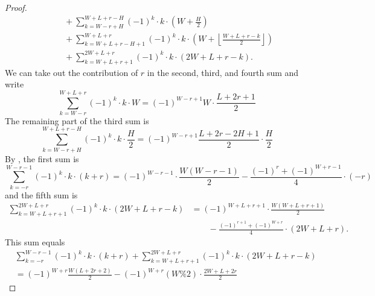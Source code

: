 \begin{proof}
\begin{align*}
    &\qquad+ \sum_{k=W-r + H}^{W+L+r - H}
      (-1)^{k} \cdot k \cdot \left( W + \frac H2 \right) \\
    &\qquad+ \sum_{k=W+L+r - H + 1}^{W+L+r} (-1)^{k} \cdot k \cdot
      \left( W + \left\lfloor \frac{W+L+r-k}{2} \right\rfloor \right) \\
    &\qquad+ \sum_{k=W+L+r+1}^{2W+L+r} (-1)^{k} \cdot k \cdot (2W+L+r-k).
  \end{align*}
  We can take out the contribution of $r$ in the second, third, and fourth sum and write
  \begin{equation}
    \sum_{k=W-r}^{W+L+r} (-1)^k \cdot k \cdot W = (-1)^{W-r+1} W \cdot \frac{L+2r+1}{2}
    \label{eq:moment234r}
  \end{equation}
  The remaining part of the third sum is
  \begin{equation}
    \sum_{k=W-r + H}^{W+L+r - H} (-1)^{k} \cdot k \cdot \frac H2
    = (-1)^{W-r+1} \frac{L+2r-2H+1}{2} \cdot \frac H2
    \label{eq:moment3top}
  \end{equation}
  By , the first sum is
  \[ \sum_{k=-r}^{W-r-1} (-1)^{k} \cdot k \cdot (k+r)
      = (-1)^{W-r-1} \cdot \frac{W(W-r-1)}{2} - \frac{(-1)^r + (-1)^{W+r-1}}{4} \cdot (-r) \]
  and the fifth sum is
  \begin{align*}
    \sum_{k=W+L+r+1}^{2W+L+r} (-1)^{k} \cdot k \cdot (2W+L+r-k)
    &= (-1)^{W+L+r+1} \cdot \frac{W(W+L+r+1)}{2} \\
      &\qquad - \frac{(-1)^{r+1} + (-1)^{W+r}}{4} \cdot (2W+L+r).
  \end{align*}
  This sum equals
  \begin{equation}
    \begin{aligned}
      &\sum_{k=-r}^{W-r-1} (-1)^{k} \cdot k \cdot (k+r)
      + \sum_{k=W+L+r+1}^{2W+L+r} (-1)^{k} \cdot k \cdot (2W+L+r-k) \\
      &= (-1)^{W+r} \frac{W(L+2r+2)}{2} - (-1)^{W+r} (W\%2) \cdot \frac{2W+L+2r}{2}
    \end{aligned}
    \label{eq:moment15}
  \end{equation}


\end{proof}
